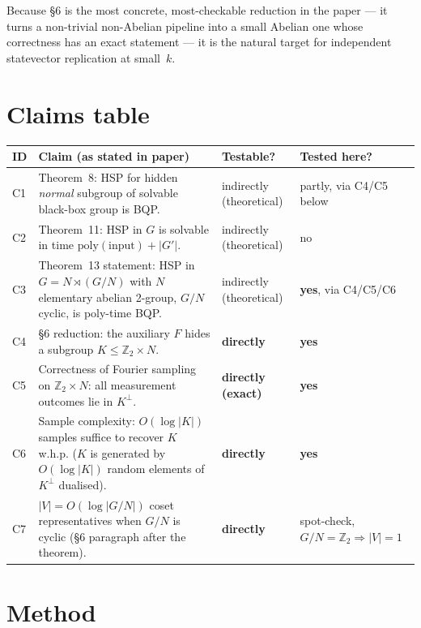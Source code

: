 \documentclass[11pt]{article}
\begin{document}
Because \S6 is the most concrete, most-checkable reduction in the paper —
it turns a non-trivial non-Abelian pipeline into a small Abelian one whose
correctness has an exact statement — it is the natural target for
independent statevector replication at small~$k$.

\section{Claims table}
\begin{center}\small
\begin{tabular}{@{}lp{7.5cm}ll@{}}
\toprule
ID & Claim (as stated in paper) & Testable? & Tested here? \\
\midrule
C1 & Theorem~8: HSP for hidden \emph{normal} subgroup of solvable
     black-box group is BQP.
   & indirectly (theoretical) & partly, via C4/C5 below \\
C2 & Theorem~11: HSP in $G$ is solvable in time
     $\mathrm{poly}(\text{input})+|G'|$.
   & indirectly (theoretical) & no \\
C3 & Theorem~13 statement: HSP in $G=N\rtimes (G/N)$ with $N$
     elementary abelian 2-group, $G/N$ cyclic, is
     poly-time BQP.
   & indirectly (theoretical) & \textbf{yes}, via C4/C5/C6 \\
C4 & \S6 reduction: the auxiliary $F$ hides a subgroup
     $K\le\mathbb{Z}_2\times N$.
   & \textbf{directly} & \textbf{yes} \\
C5 & Correctness of Fourier sampling on $\mathbb{Z}_2\times N$: all
     measurement outcomes lie in $K^\perp$.
   & \textbf{directly (exact)} & \textbf{yes} \\
C6 & Sample complexity: $O(\log|K|)$ samples suffice to recover $K$
     w.h.p.  ($K$ is generated by $O(\log|K|)$ random elements of
     $K^\perp$ dualised).
   & \textbf{directly} & \textbf{yes} \\
C7 & $|V|=O(\log|G/N|)$ coset representatives when $G/N$ is cyclic
     (\S6 paragraph after the theorem).
   & \textbf{directly} & spot-check, $G/N=\mathbb{Z}_2\Rightarrow|V|=1$ \\
\bottomrule
\end{tabular}
\end{center}

\section{Method}
\end{document}
